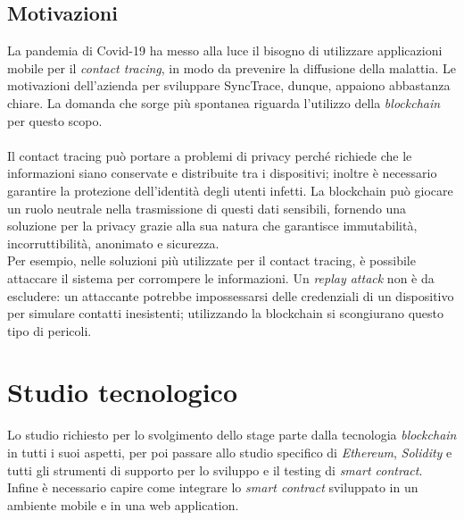 \subsection{Motivazioni}
La pandemia di Covid-19 ha messo alla luce il bisogno di utilizzare applicazioni mobile per il \textit{contact tracing}, in modo da prevenire la diffusione della malattia.  
Le motivazioni dell'azienda per sviluppare SyncTrace, dunque, appaiono abbastanza chiare. La domanda che sorge più spontanea riguarda l'utilizzo della \textit{blockchain} per questo scopo.\\\\
Il contact tracing può portare a problemi di privacy perché richiede che le informazioni siano conservate e distribuite tra i dispositivi; inoltre è necessario garantire la protezione dell'identità degli utenti infetti. La blockchain può giocare un ruolo neutrale nella trasmissione di questi dati sensibili, fornendo una soluzione per la privacy grazie alla sua natura che garantisce immutabilità, incorruttibilità, anonimato e sicurezza.\\
Per esempio, nelle soluzioni più utilizzate per il contact tracing, è possibile attaccare il sistema per corrompere le informazioni. Un \textit{replay attack} non è da escludere: un attaccante potrebbe impossessarsi delle credenziali di un dispositivo per simulare contatti inesistenti; utilizzando la blockchain si scongiurano questo tipo di pericoli.



\section{Studio tecnologico}
Lo studio richiesto per lo svolgimento dello stage parte dalla tecnologia \textit{blockchain} in tutti i suoi aspetti, per poi passare allo studio specifico di \textit{Ethereum}, \textit{Solidity} e tutti gli strumenti di supporto per lo sviluppo e il testing di \textit{smart contract}. Infine è necessario capire come integrare lo \textit{smart contract} sviluppato in un ambiente mobile e in una web application.

